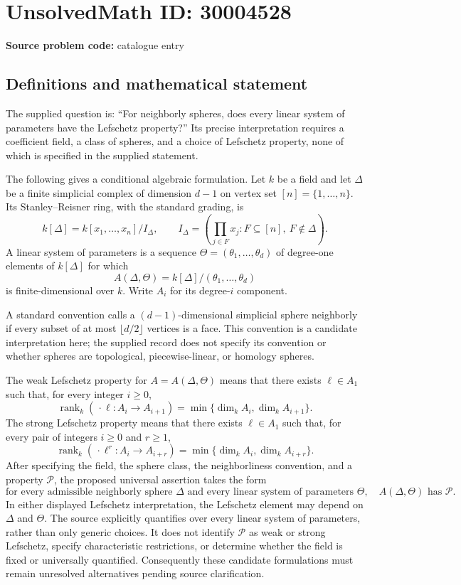 \documentclass[11pt]{article}
\begin{document}
\section*{UnsolvedMath ID: 30004528}
\textbf{Source problem code:} catalogue entry
\subsection{Definitions and mathematical statement}
The supplied question is: ``For neighborly spheres, does every linear system of parameters have the Lefschetz property?'' Its precise interpretation requires a coefficient field, a class of spheres, and a choice of Lefschetz property, none of which is specified in the supplied statement.

The following gives a conditional algebraic formulation. Let \(k\) be a field and let \(\Delta\) be a finite simplicial complex of dimension \(d-1\) on vertex set \([n]=\{1,\ldots,n\}\). Its Stanley--Reisner ring, with the standard grading, is
\[
 k[\Delta]=k[x_1,\ldots,x_n]/I_\Delta,
 \qquad
 I_\Delta=\left(\prod_{j\in F}x_j : F\subseteq[n],\ F\notin\Delta\right).
\]
A linear system of parameters is a sequence \(\Theta=(\theta_1,\ldots,\theta_d)\) of degree-one elements of \(k[\Delta]\) for which
\[
 A(\Delta,\Theta)=k[\Delta]/(\theta_1,\ldots,\theta_d)
\]
is finite-dimensional over \(k\). Write \(A_i\) for its degree-\(i\) component.

A standard convention calls a \((d-1)\)-dimensional simplicial sphere neighborly if every subset of at most \(\lfloor d/2\rfloor\) vertices is a face. This convention is a candidate interpretation here; the supplied record does not specify its convention or whether spheres are topological, piecewise-linear, or homology spheres.

The weak Lefschetz property for \(A=A(\Delta,\Theta)\) means that there exists \(\ell\in A_1\) such that, for every integer \(i\geq0\),
\[
 \operatorname{rank}_k(\,\cdot\ell:A_i\longrightarrow A_{i+1})
 =\min\{\dim_k A_i,\dim_k A_{i+1}\}.
\]
The strong Lefschetz property means that there exists \(\ell\in A_1\) such that, for every pair of integers \(i\geq0\) and \(r\geq1\),
\[
 \operatorname{rank}_k(\,\cdot\ell^r:A_i\longrightarrow A_{i+r})
 =\min\{\dim_k A_i,\dim_k A_{i+r}\}.
\]
After specifying the field, the sphere class, the neighborliness convention, and a property \(\mathcal P\), the proposed universal assertion takes the form
\[
 \text{for every admissible neighborly sphere }\Delta
 \text{ and every linear system of parameters }\Theta,
 \quad A(\Delta,\Theta)\text{ has }\mathcal P.
\]
In either displayed Lefschetz interpretation, the Lefschetz element may depend on \(\Delta\) and \(\Theta\). The source explicitly quantifies over every linear system of parameters, rather than only generic choices. It does not identify \(\mathcal P\) as weak or strong Lefschetz, specify characteristic restrictions, or determine whether the field is fixed or universally quantified. Consequently these candidate formulations must remain unresolved alternatives pending source clarification.
\end{document}
